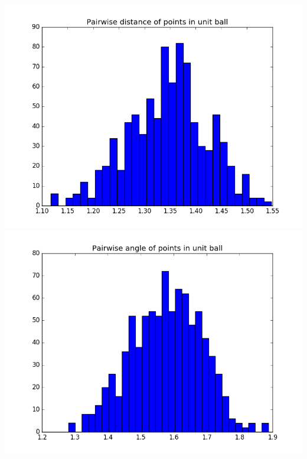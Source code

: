 \documentclass[a4paper,10pt]{article}
\begin{document}
\includegraphics[scale=.4]{b_dist}
\includegraphics[scale=.4]{b_angle}
\end{document}
